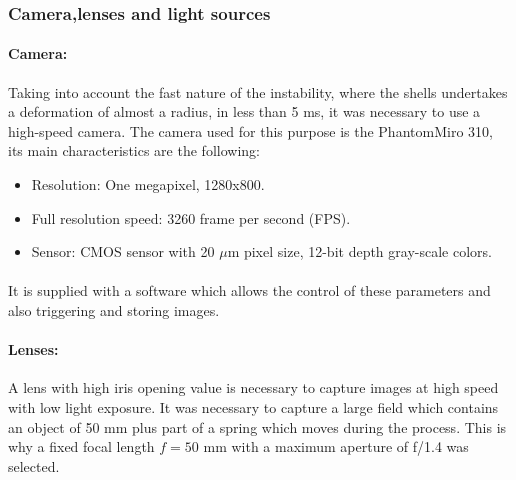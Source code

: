 \subsubsection{Camera,lenses and light sources}
\label{sssection:CLLS}
\paragraph{Camera:}
Taking into account the fast nature of the instability, where the shells undertakes a deformation of almost a radius, in less than 5 ms, it was necessary to use a high-speed camera.
The camera used for this purpose is the Phantom\textcopyright Miro 310, its main characteristics are the following:
\begin{itemize}
	\item Resolution: One megapixel, 1280x800.
	\item Full resolution speed: 3260 frame per second (FPS).
	\item Sensor: CMOS sensor with 20 $\mu$m pixel size, 12-bit depth gray-scale colors.
\end{itemize}
\paragraph{}
It is supplied with a software which allows the control of these parameters and also triggering and storing images.
\paragraph{Lenses:}
A lens with high iris opening value is necessary to capture images at high speed with low light exposure. It was necessary to capture a large field which contains an object of 50 mm plus part of a spring which moves during the process. This is why a fixed focal length $f= 50$ mm with a maximum aperture of f/1.4 was selected.

